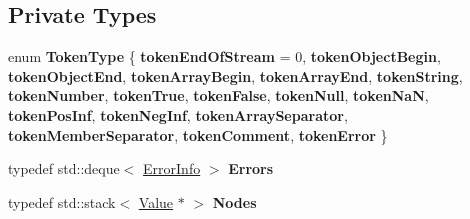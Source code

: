 \subsection*{Private Types}
\begin{DoxyCompactItemize}
\item 
\mbox{\label{classJson_1_1OurReader_a15116f7276ddf1e7a2cc3cbefa884dcc}} 
enum {\bfseries Token\+Type} \{ \newline
{\bfseries token\+End\+Of\+Stream} = 0, 
{\bfseries token\+Object\+Begin}, 
{\bfseries token\+Object\+End}, 
{\bfseries token\+Array\+Begin}, 
\newline
{\bfseries token\+Array\+End}, 
{\bfseries token\+String}, 
{\bfseries token\+Number}, 
{\bfseries token\+True}, 
\newline
{\bfseries token\+False}, 
{\bfseries token\+Null}, 
{\bfseries token\+NaN}, 
{\bfseries token\+Pos\+Inf}, 
\newline
{\bfseries token\+Neg\+Inf}, 
{\bfseries token\+Array\+Separator}, 
{\bfseries token\+Member\+Separator}, 
{\bfseries token\+Comment}, 
\newline
{\bfseries token\+Error}
 \}
\item 
\mbox{\label{classJson_1_1OurReader_a8cc69593ef7303e58e99bb5dbb767562}} 
typedef std\+::deque$<$ \hyperlink{classJson_1_1OurReader_1_1ErrorInfo}{Error\+Info} $>$ {\bfseries Errors}
\item 
\mbox{\label{classJson_1_1OurReader_a8480a5ef159cee3a090f96358414d8d3}} 
typedef std\+::stack$<$ \hyperlink{classJson_1_1Value}{Value} $\ast$ $>$ {\bfseries Nodes}
\end{DoxyCompactItemize}
